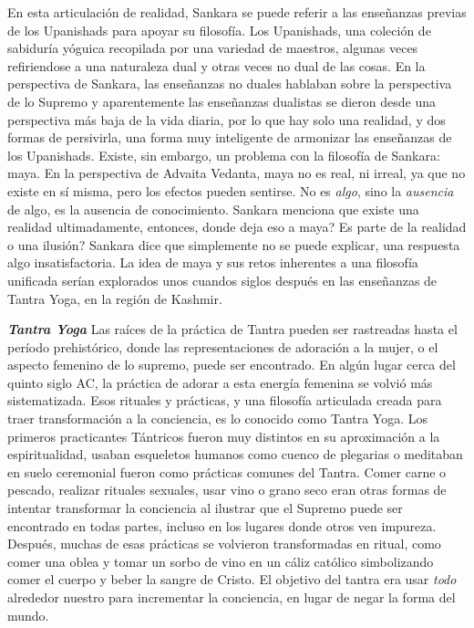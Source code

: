 En esta articulación de realidad, Sankara se puede referir a las enseñanzas previas de los Upanishads para apoyar su filosofía. Los Upanishads, una coleción de sabiduría yóguica recopilada por una variedad de maestros, algunas veces refiriendose a una naturaleza dual y otras veces no dual de las cosas. En la perspectiva de Sankara, las enseñanzas no duales hablaban sobre la perspectiva de lo Supremo y aparentemente las enseñanzas dualistas se dieron desde una perspectiva más baja de la vida diaria, por lo que hay solo una realidad, y dos formas de persivirla, una forma muy inteligente de armonizar las enseñanzas de los Upanishads. Existe, sin embargo, un problema con la filosofía de Sankara: maya. En la perspectiva de Advaita Vedanta, maya no es real, ni irreal, ya que no existe en sí misma, pero los efectos pueden sentirse. No es \textit{algo}, sino la \textit{ausencia} de algo, es la ausencia de conocimiento. Sankara menciona que existe una realidad ultimadamente, entonces, donde deja eso a maya? Es parte de la realidad o una ilusión? Sankara dice que simplemente no se puede explicar, una respuesta algo insatisfactoria. La idea de maya y sus retos inherentes a una filosofía unificada serían explorados unos cuandos siglos despu\'es en las enseñanzas de Tantra Yoga, en la región de Kashmir.

\textbf{\textit{Tantra Yoga}}
Las raíces de la práctica de Tantra pueden ser rastreadas hasta el período prehistórico, donde las representaciones de adoración a la mujer, o el aspecto femenino de lo supremo, puede ser encontrado. En algún lugar cerca del quinto siglo AC, la práctica de adorar a esta energía femenina se volvió más sistematizada. Esos rituales y prácticas, y una filosofía articulada creada para traer transformación a la conciencia, es lo conocido como Tantra Yoga. Los primeros practicantes Tántricos fueron muy distintos en su aproximación a la espiritualidad, usaban esqueletos humanos como cuenco de plegarias o meditaban en suelo ceremonial fueron como prácticas comunes del Tantra. Comer carne o pescado, realizar rituales sexuales, usar vino o grano seco eran otras formas de intentar transformar la conciencia al ilustrar que el Supremo puede ser encontrado en todas partes, incluso en los lugares donde otros ven impureza. Despu\'es, muchas de esas prácticas se volvieron transformadas en ritual, como comer una oblea y tomar un sorbo de vino en un cáliz católico simbolizando comer el cuerpo y beber la sangre de Cristo. El objetivo del tantra era usar \textit{todo} alrededor nuestro para incrementar la conciencia, en lugar de negar la forma del mundo.

